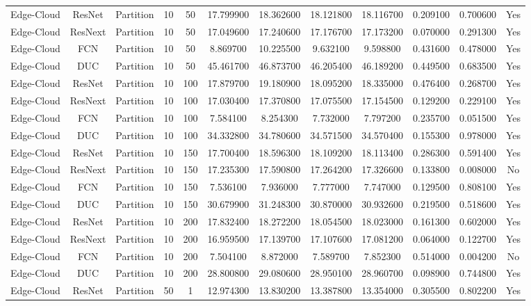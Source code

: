 \begin{tabular}{|c||c||c||c||c||c||c||c||c||c||c||c|}
Edge-Cloud & ResNet & Partition & 10 & 50 & 17.799900 & 18.362600 & 18.121800 & 18.116700 & 0.209100 & 0.700600 & Yes \\
Edge-Cloud & ResNext & Partition & 10 & 50 & 17.049600 & 17.240600 & 17.176700 & 17.173200 & 0.070000 & 0.291300 & Yes \\
Edge-Cloud & FCN & Partition & 10 & 50 & 8.869700 & 10.225500 & 9.632100 & 9.598800 & 0.431600 & 0.478000 & Yes \\
Edge-Cloud & DUC & Partition & 10 & 50 & 45.461700 & 46.873700 & 46.205400 & 46.189200 & 0.449500 & 0.683500 & Yes \\
Edge-Cloud & ResNet & Partition & 10 & 100 & 17.879700 & 19.180900 & 18.095200 & 18.335000 & 0.476400 & 0.268700 & Yes \\
Edge-Cloud & ResNext & Partition & 10 & 100 & 17.030400 & 17.370800 & 17.075500 & 17.154500 & 0.129200 & 0.229100 & Yes \\
Edge-Cloud & FCN & Partition & 10 & 100 & 7.584100 & 8.254300 & 7.732000 & 7.797200 & 0.235700 & 0.051500 & Yes \\
Edge-Cloud & DUC & Partition & 10 & 100 & 34.332800 & 34.780600 & 34.571500 & 34.570400 & 0.155300 & 0.978000 & Yes \\
Edge-Cloud & ResNet & Partition & 10 & 150 & 17.700400 & 18.596300 & 18.109200 & 18.113400 & 0.286300 & 0.591400 & Yes \\
Edge-Cloud & ResNext & Partition & 10 & 150 & 17.235300 & 17.590800 & 17.264200 & 17.326600 & 0.133800 & 0.008000 & No \\
Edge-Cloud & FCN & Partition & 10 & 150 & 7.536100 & 7.936000 & 7.777000 & 7.747000 & 0.129500 & 0.808100 & Yes \\
Edge-Cloud & DUC & Partition & 10 & 150 & 30.679900 & 31.248300 & 30.870000 & 30.932600 & 0.219500 & 0.518600 & Yes \\
Edge-Cloud & ResNet & Partition & 10 & 200 & 17.832400 & 18.272200 & 18.054500 & 18.023000 & 0.161300 & 0.602000 & Yes \\
Edge-Cloud & ResNext & Partition & 10 & 200 & 16.959500 & 17.139700 & 17.107600 & 17.081200 & 0.064000 & 0.122700 & Yes \\
Edge-Cloud & FCN & Partition & 10 & 200 & 7.504100 & 8.872000 & 7.589700 & 7.852300 & 0.514000 & 0.004200 & No \\
Edge-Cloud & DUC & Partition & 10 & 200 & 28.800800 & 29.080600 & 28.950100 & 28.960700 & 0.098900 & 0.744800 & Yes \\
Edge-Cloud & ResNet & Partition & 50 & 1 & 12.974300 & 13.830200 & 13.387800 & 13.354000 & 0.305500 & 0.802200 & Yes \\

\end{tabular}
